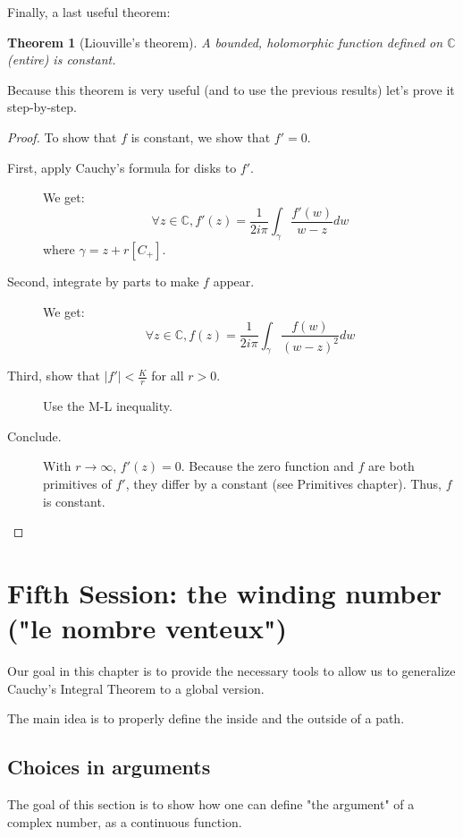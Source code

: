 \documentclass{article}
\newtheorem*{thm*}{Theorem}
\begin{document}
Finally, a last useful theorem:

\begin{thm*}[Liouville's theorem]
    A bounded, holomorphic function defined on $\mathbb{C}$ (\emph{entire}) is constant.
\end{thm*}

Because this theorem is very useful (and to use the previous results) let's prove it step-by-step.

\begin{proof}
    To show that $f$ is constant, we show that $f' = 0$.
    \begin{description}
        \item[First, apply Cauchy's formula for disks to $f'$.]
            We get:
            $$ \forall z\in\mathbb{C}, f'(z) = \frac{1}{2i\pi} \int_\gamma\frac{f'(w)}{w-z}dw$$
            where $\gamma = z + r[C_+]$.
        \item[Second, integrate by parts to make $f$ appear.]
            We get:
            $$ \forall z\in\mathbb{C}, f(z) = \frac{1}{2i\pi} \int_\gamma\frac{f(w)}{(w-z)^2}dw$$
        \item[Third, show that $|f'| < \frac{K}{r}$ for all $r > 0$.] Use the M-L inequality.
        \item[Conclude.] With $r\rightarrow \infty$, $f'(z) = 0$. Because the zero function and $f$ are both primitives of $f'$, they differ by a constant (see Primitives chapter). Thus, $f$ is constant.
    \end{description}
\end{proof}


\newpage
\section{Fifth Session: the winding number ("le nombre venteux")}

Our goal in this chapter is to provide the necessary tools to allow us to generalize Cauchy's Integral Theorem to a global version.

The main idea is to properly define the inside and the outside of a path.

\subsection{Choices in arguments}

The goal of this section is to show how one can define "the argument" of a complex number, as a continuous function. 
\end{document}
